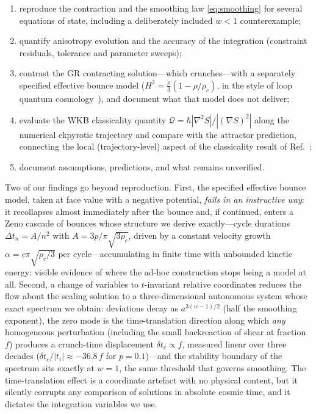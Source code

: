 \documentclass[11pt,a4paper]{article}
\newcommand{\rhoc}{\rho_c}
\newcommand{\cQ}{\mathcal{Q}}
\begin{document}
\begin{enumerate}
  \item reproduce the contraction and the smoothing law
        \eqref{eq:smoothing} for several equations of state, including a
        deliberately included $w<1$ counterexample;
  \item quantify anisotropy evolution and the accuracy of the integration
        (constraint residuals, tolerance and parameter sweeps);
  \item contrast the GR contracting solution---which crunches---with a
        separately specified effective bounce model
        ($H^2=\frac{\rho}{3}(1-\rho/\rhoc)$, in the style of loop quantum
        cosmology~\cite{Ashtekar:2006wn}), and document what that model
        does not deliver;
  \item evaluate the WKB classicality quantity
        $\cQ=\hbar|\nabla^2S|/|(\nabla S)^2|$ along the numerical
        ekpyrotic trajectory and compare with the attractor prediction,
        connecting the local (trajectory-level) aspect of the classicality
        result of Ref.~\cite{Lehners:2015};
  \item document assumptions, predictions, and what remains unverified.
\end{enumerate}

Two of our findings go beyond reproduction. First, the specified effective
bounce model, taken at face value with a negative potential, \emph{fails in
an instructive way}: it recollapses almost immediately after the bounce and,
if continued, enters a Zeno cascade of bounces whose structure we derive
exactly---cycle durations $\Delta t_n=A/n^2$ with $A=3p/\pi\sqrt{3\rhoc}$,
driven by a constant velocity growth $\alpha=c\pi\sqrt{\rhoc/3}$ per
cycle---accumulating in finite time with unbounded kinetic energy: visible evidence of where the
ad-hoc construction stops being a model at all. Second, a change of
variables to $t$-invariant relative coordinates reduces the flow about the
scaling solution to a three-dimensional autonomous system whose exact
spectrum we obtain: deviations decay as $a^{3(w-1)/2}$ (half the smoothing
exponent), the zero mode is the time-translation direction along which
\emph{any} homogeneous perturbation (including the small backreaction of
shear at fraction $f$) produces a crunch-time displacement
$\delta t_c\propto f$, measured linear over three decades
($\delta t_c/|t_i|\approx-36.8\,f$ for $p=0.1$)---and the stability boundary
of the spectrum sits exactly at $w=1$, the same threshold that governs
smoothing. The time-translation effect is a coordinate artefact with no
physical content, but it silently corrupts any comparison of solutions in
absolute cosmic time, and it dictates the integration variables we use.
\end{document}
